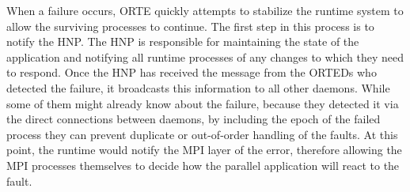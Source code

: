When a failure occurs, ORTE quickly attempts to stabilize the runtime system to
allow the surviving processes to continue. The first step in this process is to
notify the HNP. The HNP is responsible for maintaining the state of the
application and notifying all runtime processes of any changes to which they
need to respond. Once the HNP has received the message from the ORTEDs who
detected the failure, it broadcasts this information to all other daemons.
While some of them might already know about the failure, because they detected
it via the direct connections between daemons, by including the epoch of the
failed process they can prevent duplicate or out-of-order handling of the
faults. At this point, the runtime would notify the MPI layer of the error,
therefore allowing the MPI processes themselves to decide how the parallel
application will react to the fault.


